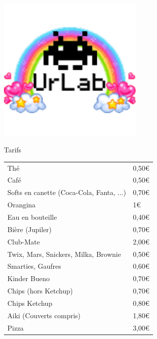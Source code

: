 \documentclass[a4paper,12pt]{article}
\begin{document}
\parindent0pt
\begin{center}
\includegraphics[width=200pt]{urlab.png}

 \Huge Tarifs
\end{center}

\LARGE
\begin{tabular}{ | l | l |}
  \hline
  Thé & 0,50\euro \\
  Café & 0,50\euro \\
  Softs en canette (Coca-Cola, Fanta, ...) & 0,70\euro \\
  Orangina & 1\euro \\
  Eau en bouteille & 0,40\euro \\
  Bière (Jupiler) & 0,70\euro \\
  Club-Mate & 2,00\euro \\
  \hline
  Twix, Mars, Snickers, Milka, Brownie & 0,50\euro \\
  Smarties, Gaufres & 0,60\euro \\
  Kinder Bueno & 0,70\euro \\
  Chips (hors Ketchup) & 0,70\euro \\
  Chips Ketchup & 0,80\euro \\
  \hline
  Aiki (Couverts compris) & 1,80\euro \\
  Pizza & 3,00\euro \\
  \hline

  \hline
\end{tabular}
\end{document}
